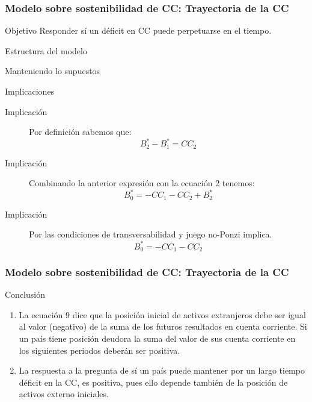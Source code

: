 \documentclass[10pt, xcolor=table, x11names]{beamer}
\begin{document}
\begin{frame}[label=INTRODUCCION2]
	\frametitle{{\normalsize Modelo sobre sostenibilidad de CC: Trayectoria de la CC} {}}
	\begin{block} {Objetivo}
		Responder sí un déficit en CC puede perpetuarse en el tiempo.\\	
	\end{block}	
	\begin{block} {Estructura del modelo}
		\begin{description}
			\item[ Manteniendo lo supuestos] 
		\end{description}
	\end{block}	
	\begin{block} {Implicaciones}
		\begin{description}
			\item[Implicación] Por definición sabemos que:
			\begin{equation}
			B_{2}^{*}-B_{1}^{*}= CC_{2}
			\end{equation}
			\item[Implicación] Combinando la anterior expresión con la ecuación 2 tenemos:
			\begin{equation}
			B_{0}^{*}= -CC_{1}-CC_{2}+B_{2}^{*}
			\end{equation}
			\item[Implicación] Por las condiciones de transversabilidad y juego no-Ponzi implica.
			\begin{equation}
			B_{0}^{*}= -CC_{1}-CC_{2}
			\end{equation}
		\end{description}
	\end{block}	
\end{frame}

\begin{frame}[label=MODELO22]
	\frametitle{{\normalsize Modelo sobre sostenibilidad de CC: Trayectoria de la CC} {}}
	\begin{block} {Conclusión}
		\begin{enumerate}
			\item La ecuación 9 dice que la posición inicial de activos extranjeros debe ser igual al valor (negativo) de la suma de los futuros resultados en cuenta corriente. Si un país tiene posición deudora la suma del valor de sus cuenta corriente en los siguientes periodos deberán ser positiva.
			\item La respuesta a la pregunta de sí un país puede mantener por un largo tiempo déficit en la CC, es positiva, pues ello depende también de la posición de activos externo iniciales. 
			
		\end{enumerate}	
	\end{block}		
\end{frame}	
	
\end{document}
